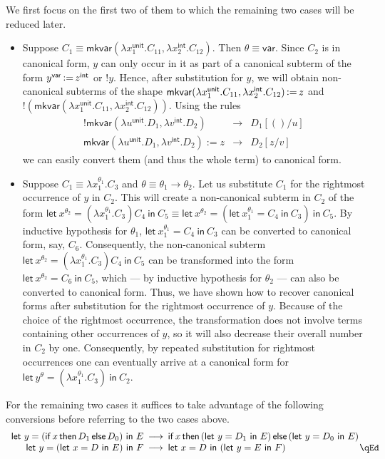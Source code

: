 \documentclass{CSML}
\theoremstyle{definition}\newtheorem{definition}[thm]{Definition}
\theoremstyle{definition}\newtheorem{example}[thm]{Example}
\theoremstyle{definition}\newtheorem{proposition}[thm]{Proposition}
\theoremstyle{definition}\newtheorem{lemma}[thm]{Lemma}
\theoremstyle{definition}\newtheorem{theorem}[thm]{Theorem}
\theoremstyle{definition}\newtheorem{corollary}[thm]{Corollary}
\theoremstyle{definition}\newtheorem{remark}[thm]{Remark}
\newcommand\lrarr\longrightarrow
\newcommand\letin[2]{\mathsf{let}\ #1\ \mathsf{in}\ #2}
\newcommand\badvar[2]{\mathsf{mkvar}(#1,#2)}
\newcommand{\aasg}{\,\raisebox{0.065ex}{:}{=}\,}
\newcommand\comt{\mathsf{unit}}
\newcommand\expt{\mathsf{int}}
\newcommand\vart{\mathsf{var}}
\newcommand\cond[3]{\mathsf{if}\,#1\,\mathsf{then}\,#2\,\mathsf{else}\,#3}
\newcommand{\rarr}{\rightarrow}
\begin{document}
We first focus on the first two of them to which the remaining two cases will be reduced later.
\begin{itemize}
\item Suppose $C_1\equiv\badvar{\lambda x_1^\comt.C_{11}}{\lambda x_2^\expt.C_{12}}$.
Then $\theta\equiv\vart$. Since $C_2$ is in canonical form, $y$ can only
occur in it as part of a canonical subterm of the form $y^\vart\aasg z^\expt$ or $!y$.
Hence, after substitution for $y$, we will obtain non-canonical subterms of the shape
$\badvar{\lambda x_1^\comt.C_{11}}{\lambda x_2^\expt.C_{12}}\aasg z$ and
$!(\badvar{\lambda x_1^\comt.C_{11}}{\lambda x_2^\expt.C_{12}})$.
Using the rules
\renewcommand\arraystretch{1}
\[\begin{array}{rcl}
! \badvar{\lambda u^\comt.D_1}{\lambda v^\expt.D_2} &\!\!\!\lrarr\!\!\!& D_1[()/u]\\
\badvar{\lambda u^\comt.D_1}{\lambda v^\expt.D_2}:= z &\!\!\!\lrarr\!\!\!& D_2[z/v]
\end{array}\]
we can easily convert them (and thus the whole term) to canonical form.
\item Suppose $C_1\equiv\lambda x_1^{\theta_1}.C_3$ and $\theta\equiv\theta_1\rarr\theta_2$.
Let us substitute $C_1$ for the rightmost occurrence of $y$ in $C_2$.
This will create a non-canonical subterm in $C_2$ of the form
$\letin{x^{\theta_2}=(\lambda x_1^{\theta_1}.C_3) C_4}{C_5}\equiv \letin{x^{\theta_2}=(\letin{x_1^{\theta_1}=C_4}{C_3})}{C_5}$.
By inductive hypothesis for $\theta_1$, $\letin{x_1^{\theta_1}=C_4}{C_3}$ can be converted to canonical form, say, $C_6$.
Consequently, the non-canonical subterm $\letin{x^{\theta_2}=(\lambda x_1^{\theta_1}.C_3) C_4}{C_5}$
 can be transformed into the form $\letin{x^{\theta_2}=C_6}{C_5}$, which --- by inductive hypothesis for $\theta_2$ --- can 
 also be converted to canonical form. Thus, we have shown how to recover canonical forms after substitution for the 
 rightmost occurrence of $y$. Because of the choice of the rightmost occurrence, the transformation does not
 involve terms containing other occurrences of $y$, so it will also decrease their overall number in $C_2$ by one.
Consequently, by repeated substitution for rightmost occurrences one can eventually arrive at a canonical form 
 for $\letin{y^\theta=(\lambda x_1^{\theta_1}.C_3)}{C_2}$.
 \end{itemize}
For the remaining two cases it suffices to take advantage of the following conversions
before referring to the two cases above.
\renewcommand\arraystretch{1}
\[\begin{array}{rcl}
\letin{y=(\cond{x}{D_1}{D_0})}{E}&\!\!\!\lrarr\!\!\! & \cond{x}{(\letin{y=D_1}{E})}{(\letin{y=D_0}{E})}\\
\letin{y=(\letin{x=D}{E})}{F} &\!\!\!\lrarr\!\!\!
                                                     &\letin{x=D}{(\letin{y=E}{F})}
\rlap{\hbox to100 pt{\hfill\qEd}}
\end{array}\]\smallskip
\end{document}
